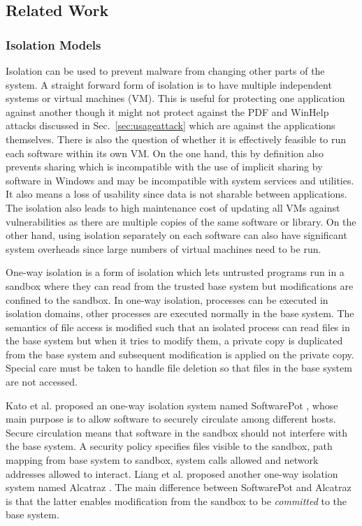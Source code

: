 \subsection{Related Work}
\label{sec:prevworks}


\subsubsection{Isolation Models}

Isolation can be used to prevent malware from changing
other parts of the system.
A straight forward form of isolation is to have 
multiple independent systems or virtual machines (VM).
This is useful for protecting one application against another though
it might not protect against the PDF and WinHelp attacks discussed in
Sec.~\ref{sec:usageattack} which are against the applications themselves.
There is also the question of whether it is effectively feasible to 
run each software within its own VM.
On the one hand,
this by definition also prevents sharing which is incompatible
with the use of implicit sharing by software in Windows and
may be incompatible with system services and utilities.
It also means a loss of usability since data is not sharable
between applications.
The isolation also leads to high
maintenance cost of updating all VMs against
vulnerabilities as there are multiple copies of
the same software or library.
On the other hand, using isolation separately on each software can also
have significant system overheads since large numbers of virtual machines
need to be run.

One-way isolation is a form of isolation which
lets untrusted programs run in a sandbox where they can read from the
trusted base system but modifications are confined to the sandbox.
In one-way isolation, processes can be executed in isolation domains,
other processes are executed normally in the base system.
The semantics of file access is modified such that an isolated process
can read files in the base system but when it tries to modify them,
a private copy is duplicated from the base system and subsequent modification
is applied on the private copy.
Special care must be taken to handle file deletion so that files in the
base system are not accessed.

Kato et al. proposed an one-way isolation system named
SoftwarePot \cite{kato2003softwarepot},
whose main purpose is to allow software to securely circulate among
different hosts.
Secure circulation means that software in the sandbox should not interfere
with the base system.
A security policy specifies files visible to the sandbox,
path mapping from base system to sandbox, system calls allowed and
network addresses allowed to interact.
Liang et al. proposed another one-way isolation system named
Alcatraz \cite{liang2009alcatraz}.
The main difference between SoftwarePot and Alcatraz is that the latter
enables modification from the sandbox to be {\em committed} to the base
system.

